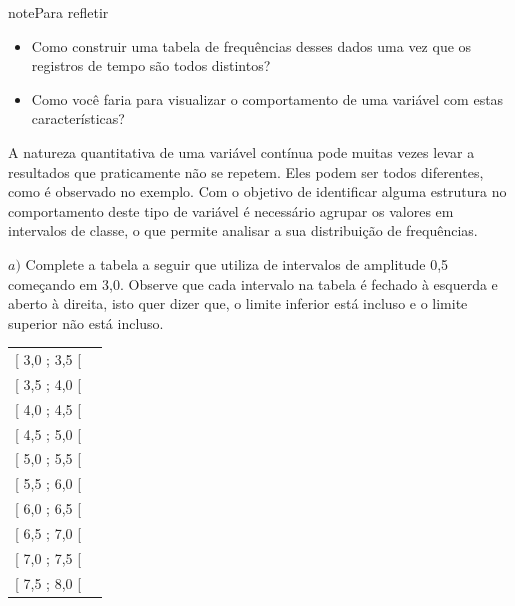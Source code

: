 \begin{sphinxadmonition}{note}{Para refletir}
\begin{itemize}
\item {} 
Como construir uma tabela de frequências desses dados uma vez que os registros de tempo são todos distintos?

\item {} 
Como você faria para visualizar o comportamento de uma variável com estas características?

\end{itemize}
\end{sphinxadmonition}

A natureza quantitativa de uma variável contínua pode muitas vezes levar a resultados que praticamente não se repetem. Eles podem ser todos diferentes, como é observado no exemplo. Com o objetivo de identificar alguma estrutura no comportamento deste tipo de variável é necessário agrupar os valores em intervalos de classe, o que permite analisar a sua distribuição de frequências.

\(a)\) Complete a tabela a seguir que utiliza de intervalos de amplitude 0,5 começando em 3,0. Observe que cada intervalo na tabela é fechado à esquerda e aberto à direita, isto quer dizer que, o limite inferior está incluso e o limite superior não está incluso.


\begin{savenotes}\sphinxattablestart
\centering
\begin{tabulary}{\linewidth}[t]{|T|T|}
\hline
{}\relax &\relax \\
\hline
{[} 3,0 ; 3,5 {[}
&\\
\hline
{[} 3,5 ; 4,0 {[}
&\\
\hline
{[} 4,0 ; 4,5 {[}
&\\
\hline
{[} 4,5 ; 5,0 {[}
&\\
\hline
{[} 5,0 ; 5,5 {[}
&\\
\hline
{[} 5,5 ; 6,0 {[}
&\\
\hline
{[} 6,0 ; 6,5 {[}
&\\
\hline
{[} 6,5 ; 7,0 {[}
&\\
\hline
{[} 7,0 ; 7,5 {[}
&\\
\hline
{[} 7,5 ; 8,0 {[}
&\\
\hline
\end{tabulary}
\par
\sphinxattableend\end{savenotes}

